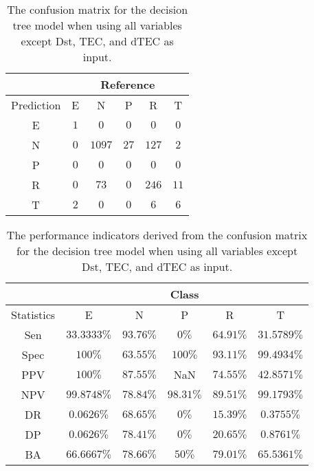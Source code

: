 \begin{table}[!ht]
	\centering
	\begin{tabular}{|c|c|c|c|c|c|}
		\hline
		 & \multicolumn{5}{|c|}{Reference} \\ \hline
		 Prediction & E & N & P & R & T \\ \hline
		 E & $1$ & $0$ & $0$ & $0$ & $0$ \\ \hline
		 N & $0$ & $1097$ & $27$ & $127$ & $2$ \\ \hline
		 P & $0$ & $0$ & $0$ & $0$ & $0$ \\ \hline
		 R & $0$ & $73$ & $0$ & $246$ & $11$ \\ \hline
		 T & $2$ & $0$ & $0$ & $6$ & $6$ \\ \hline
	\end{tabular}
	\caption{The confusion matrix for the decision tree model when using all variables except Dst, TEC, and dTEC as input.}
	\label{tab:cm:noTEC:C5.0}
\end{table}

\begin{table}[!ht]
	\centering
	\begin{tabular}{|c|c|c|c|c|c|}
		\hline
		 & \multicolumn{5}{c|}{Class} \\ \hline
		Statistics & E & N & P & R & T \\ \hline
		Sen & $33.3333\%$ & $93.76\%$ & $0\%$ & $64.91\%$ & $31.5789\%$ \\ \hline
		Spec & $100\%$ & $63.55\%$ & $100\%$ & $93.11\%$ & $99.4934\%$ \\ \hline
		PPV & $100\%$ & $87.55\%$ & NaN & $74.55\%$ & $42.8571\%$ \\ \hline
		NPV & $99.8748\%$ & $78.84\%$ & $98.31\%$ & $89.51\%$ & $99.1793\%$ \\ \hline
		DR & $0.0626\%$ & $68.65\%$ & $0\%$ & $15.39\%$ & $0.3755\%$ \\ \hline
		DP & $0.0626\%$ & $78.41\%$ & $0\%$ & $20.65\%$ & $0.8761\%$ \\ \hline
		BA & $66.6667\%$ & $78.66\%$ & $50\%$ & $79.01\%$ & $65.5361\%$ \\ \hline
	\end{tabular}
	\caption{The performance indicators derived from the confusion matrix for the decision tree model when using all variables except Dst, TEC, and dTEC as input.}
	\label{tab:cs:reverse:noTEC:C5.0}
\end{table}
